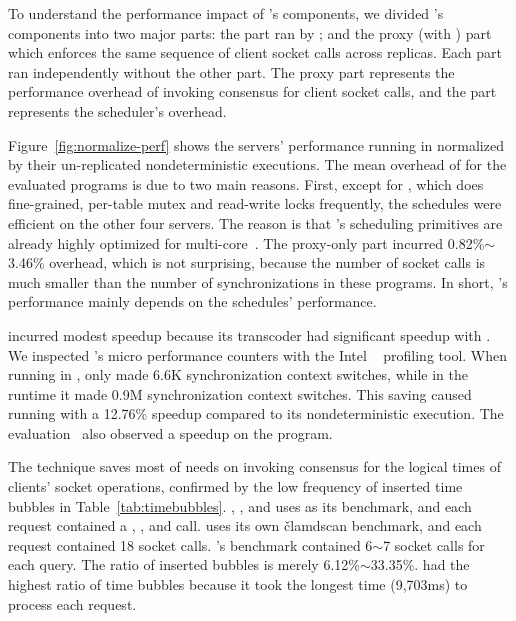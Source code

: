 To understand the performance impact of \xxx's components, we divided \xxx's 
components into two major parts: the \dmt part ran by \parrot; and the proxy 
(with \paxos) part which enforces the same sequence of client socket 
calls across replicas. Each part ran independently without the other 
part. The proxy part represents the performance overhead of invoking \paxos 
consensus for client socket calls, and the \dmt part represents the \parrot 
\dmt scheduler's overhead.

Figure~\ref{fig:normalize-perf} shows the servers' performance running in 
\xxx normalized by their un-replicated nondeterministic executions. The mean 
overhead of \xxx for the \nprog evaluated programs is \overhead 
due to two main reasons. First, except for \mysql, which does fine-grained, 
per-table mutex and read-write locks frequently, the \dmt schedules were 
efficient on the other four servers. The reason is that \parrot's scheduling 
primitives are already highly optimized for multi-core~\cite{parrot:sosp13}. 
The proxy-only part incurred 0.82\%$\sim$3.46\% overhead, which is not 
surprising, because the number of socket calls is much smaller than 
the number of \pthread synchronizations in these programs. In short, \xxx's 
performance mainly depends on the \dmt schedules' performance.

\mediatomb incurred modest speedup because its transcoder \mencoder had 
significant speedup with \parrot. We inspected \mediatomb's micro performance 
counters with the Intel \vtune~\cite{vtune} profiling tool. When running in 
\xxx, \mediatomb only made 6.6K synchronization context switches, while in the 
\pthread runtime it made 0.9M synchronization context switches. This saving 
caused \mediatomb running with \parrot a 12.76\% speedup compared 
to its nondeterministic execution. The \parrot evaluation~\cite{parrot:sosp13} 
also observed a \mencoderspeedup speedup on the \mencoder program. 

The \timealgo technique saves most of needs on invoking consensus 
for the logical times of clients' socket operations, confirmed by the low 
frequency of inserted time bubbles in Table~\ref{tab:timebubbles}. \apache, 
\mediatomb, and \mongoose uses \ab as its benchmark, and each request contained 
a \connect, \send, and \close call. \clamav uses its own \v{clamdscan} 
benchmark, and each request contained 18 socket calls. \mysql's benchmark 
contained 6$\sim$7 socket calls for each query. The ratio of inserted 
bubbles is merely 6.12\%$\sim$33.35\%. \mediatomb had the highest ratio of time 
bubbles because it took the longest time (9,703ms) to process each 
request.


